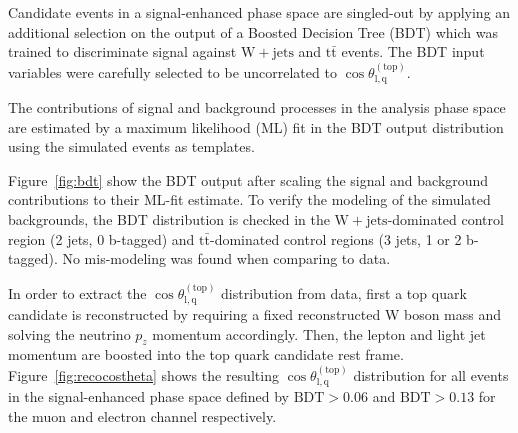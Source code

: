 \documentclass[a4paper]{jpconf}
\newcommand{\wjets}[0]{\mathrm{W+jets}}
\newcommand{\ttbar}[0]{\ensuremath{\mathrm{t\bar{t}}}}
\newcommand{\costheta}[0]{\cos\theta_{\mathrm{l,q}}^{\mathrm{(top)}}}
\newcommand{\BDT}[0]{\ensuremath{\mathrm{BDT}}}
\begin{document}
Candidate events in a signal-enhanced phase space are singled-out by applying an additional selection on the output of a Boosted Decision Tree (BDT) which was trained to discriminate signal against $\wjets$ and $\ttbar$ events. The BDT input variables were carefully selected to be uncorrelated to $\costheta$.


The contributions of signal and background processes in the analysis phase space are estimated by a maximum likelihood (ML) fit in the BDT output distribution using the simulated events as templates.


Figure~\ref{fig:bdt} show the BDT output after scaling the signal and background contributions to their ML-fit estimate. To verify the modeling of the simulated backgrounds, the BDT distribution is checked in the $\wjets$-dominated control region (2 jets, 0 b-tagged) and $\ttbar$-dominated control regions (3 jets, 1 or 2 b-tagged). No mis-modeling was found when comparing to data.


In order to extract the $\costheta$ distribution from data, first a top quark candidate is reconstructed by requiring a fixed reconstructed W boson mass and solving the neutrino $p_{z}$ momentum accordingly. Then, the lepton and light jet momentum are boosted into the top quark candidate rest frame. Figure~\ref{fig:recocostheta} shows the resulting $\costheta$ distribution for all events in the signal-enhanced phase space defined by $\BDT>0.06$ and $\BDT>0.13$ for the muon and electron channel respectively.
\end{document}
